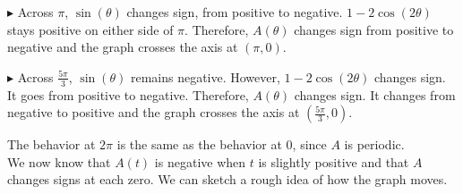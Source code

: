 \documentclass{ximera}
\begin{document}
$\blacktriangleright$  Across $\pi$, $\sin(\theta)$ changes sign, from positive to negative.  $1 - 2\cos(2\theta)$ stays positive on either side of $\pi$.  Therefore, $A(\theta)$ changes sign from positive to negative and the graph crosses the axis at $(\pi, 0)$.


$\blacktriangleright$  Across $\frac{5\pi}{3}$, $\sin(\theta)$ remains negative. However, $1 - 2\cos(2\theta)$ changes sign.  It goes from positive to negative. Therefore, $A(\theta)$ changes sign. It changes from negative to positive and the graph crosses the axis at $\left( \frac{5\pi}{3}, 0 \right)$.

The behavior at $2\pi$ is the same as the behavior at $0$, since $A$ is periodic. \\





We now know that $A(t)$ is negative when $t$ is slightly positive and that $A$ changes signs at each zero. We can sketch a rough idea of how the graph moves.
\end{document}
